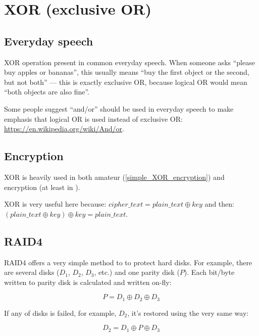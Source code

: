 ﻿\section{XOR (exclusive OR)}
\label{XOR_property}

\EN{}
\RU{}
\ES{}

\subsection{Everyday speech}

XOR operation present in common everyday speech.
When someone asks ``please buy apples or bananas'',
this usually means ``buy the first object or the second, but not both'' --- this is exactly exclusive OR,
because logical OR would mean ``both objects are also fine''.

Some people suggest ``and/or'' should be used in everyday speech to make emphasis that logical OR is used instead of
exclusive OR: \url{https://en.wikipedia.org/wiki/And/or}.

\subsection{Encryption}

XOR is heavily used in both amateur (\ref{simple_XOR_encryption}) and  encryption (at least in ).

XOR is very useful here because:
$cipher\_text = plain\_text \oplus key$ and then:
$(plain\_text \oplus key) \oplus key = plain\_text$.

\subsection{\ac{RAID}4}

\ac{RAID}4 offers a very simple method to to protect hard disks.
For example, there are several disks ($D_1$, $D_2$, $D_3$, etc.) and one parity disk ($P$).
Each bit/byte written to parity disk is calculated and written on-fly:

\begin{equation} \label{eq:RAID4}
P = D_1 \oplus D_2 \oplus D_3
\end{equation}

If any of disks is failed, for example, $D_2$, it's restored using the very same way:

\begin{equation}
D_2 = D_1 \oplus P \oplus D_3
\end{equation}

